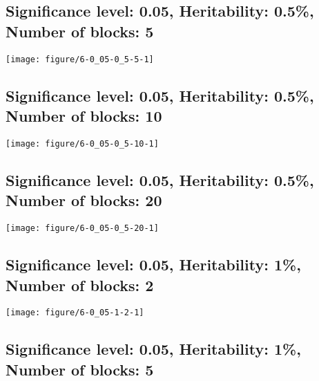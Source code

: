 \documentclass[11pt,letter]{article}\usepackage[]{graphicx}\usepackage[]{color}
\makeatletter
\def\maxwidth{ %
  \ifdim\Gin@nat@width>\linewidth
    \linewidth
  \else
    \Gin@nat@width
  \fi
}
\newenvironment{knitrout}{}{} %
\makeatother
\begin{document}
\newpage
\subsection{Significance level: 0.05, Heritability: 0.5\%, Number of blocks: 5}

\begin{knitrout}
\color{fgcolor}
\texttt{[image: figure/6-0\_05-0\_5-5-1]} 

\end{knitrout}

\newpage
\subsection{Significance level: 0.05, Heritability: 0.5\%, Number of blocks: 10}

\begin{knitrout}
\color{fgcolor}
\texttt{[image: figure/6-0\_05-0\_5-10-1]} 

\end{knitrout}

\newpage
\subsection{Significance level: 0.05, Heritability: 0.5\%, Number of blocks: 20}

\begin{knitrout}
\color{fgcolor}
\texttt{[image: figure/6-0\_05-0\_5-20-1]} 

\end{knitrout}

\newpage
\subsection{Significance level: 0.05, Heritability: 1\%, Number of blocks: 2}

\begin{knitrout}
\color{fgcolor}
\texttt{[image: figure/6-0\_05-1-2-1]} 

\end{knitrout}

\newpage
\subsection{Significance level: 0.05, Heritability: 1\%, Number of blocks: 5}
\end{document}
